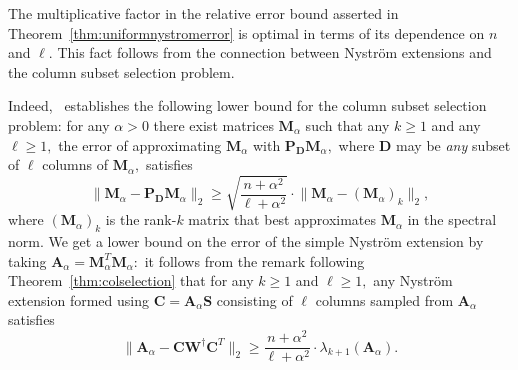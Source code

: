 \documentclass[11pt,letterpaper,twoside,reqno,nosumlimits]{amsart}
\def\pinv{\dagger}
\def\transp{T}
\newcommand{\mat}[1]{\ensuremath{\mathbf{#1}}}
\newcommand{\norm}[1]{\ensuremath{\big\|#1\big\|}}
\newcommand{\snorm}[1]{\ensuremath{\big\|#1\big\|_2}}
\theoremstyle{remark}
\begin{document}
%  

 The multiplicative factor in the relative error bound asserted in Theorem~\ref{thm:uniformnystromerror} is optimal in terms of its dependence on $n$ and $\ell.$ This fact follows from the connection between Nystr\"om extensions and the column subset selection problem. 
 
 Indeed,~\cite{BDM11} establishes the following lower bound for the column subset selection problem:
 for any $\alpha >0$ there exist matrices $\mat{M}_\alpha$ such that any $k \geq 1$ and any $\ell \geq 1,$ the error of approximating $\mat{M}_\alpha$ with $\mat{P}_{\mat{D}}\mat{M}_\alpha,$ where $\mat{D}$ may be \emph{any} subset of $\ell$ columns of $\mat{M}_\alpha,$ satisfies
 \[
  \snorm{\mat{M}_\alpha - \mat{P}_{\mat{D}}\mat{M}_\alpha} \geq \sqrt{\frac{n + \alpha^2}{\ell + \alpha^2}} \cdot \snorm{\mat{M}_\alpha - (\mat{M}_\alpha)_k},
 \]
 where $(\mat{M}_\alpha)_k$ is the rank-$k$ matrix that best approximates $\mat{M}_\alpha$ in the spectral norm. We get a lower bound on the error of the simple Nystr\"om extension by taking $\mat{A}_\alpha = \mat{M}_\alpha^\transp \mat{M}_\alpha:$ it follows from the remark following Theorem~\ref{thm:colselection} that for any $k \geq 1$ and $\ell \geq 1,$ any Nystr\"om extension formed using $\mat{C} = \mat{A}_\alpha \mat{S}$ consisting of $\ell$ columns sampled from $\mat{A}_\alpha$ satisfies
 \[
  \snorm{\mat{A}_\alpha - \mat{C}\mat{W}^\pinv\mat{C}^\transp} \geq \frac{n + \alpha^2}{\ell + \alpha^2} \cdot \lambda_{k+1}(\mat{A}_\alpha).
 \]
\end{document}
